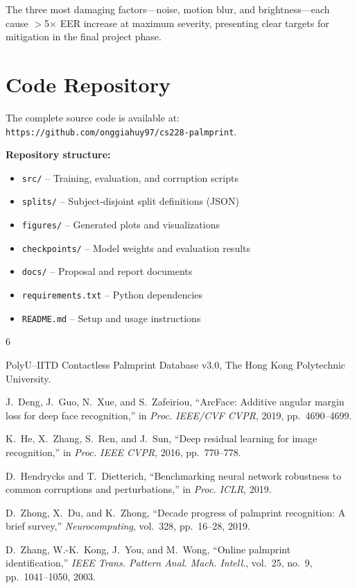 \documentclass[conference]{IEEEtran}
\begin{document}
The three most damaging factors---noise, motion blur, and brightness---each cause $>$5$\times$ EER increase at maximum severity, presenting clear targets for mitigation in the final project phase.

\section{Code Repository}

The complete source code is available at: \texttt{https://github.com/onggiahuy97/cs228-palmprint}.

\medskip
\noindent\textbf{Repository structure:}
\begin{itemize}
    \item \texttt{src/} -- Training, evaluation, and corruption scripts
    \item \texttt{splits/} -- Subject-disjoint split definitions (JSON)
    \item \texttt{figures/} -- Generated plots and visualizations
    \item \texttt{checkpoints/} -- Model weights and evaluation results
    \item \texttt{docs/} -- Proposal and report documents
    \item \texttt{requirements.txt} -- Python dependencies
    \item \texttt{README.md} -- Setup and usage instructions
\end{itemize}


\begin{thebibliography}{6}

PolyU--IITD Contactless Palmprint Database v3.0, The Hong Kong Polytechnic University.

J.~Deng, J.~Guo, N.~Xue, and S.~Zafeiriou, ``ArcFace: Additive angular margin loss for deep face recognition,'' in \textit{Proc. IEEE/CVF CVPR}, 2019, pp.~4690--4699.

K.~He, X.~Zhang, S.~Ren, and J.~Sun, ``Deep residual learning for image recognition,'' in \textit{Proc. IEEE CVPR}, 2016, pp.~770--778.

D.~Hendrycks and T.~Dietterich, ``Benchmarking neural network robustness to common corruptions and perturbations,'' in \textit{Proc. ICLR}, 2019.

D.~Zhong, X.~Du, and K.~Zhong, ``Decade progress of palmprint recognition: A brief survey,'' \textit{Neurocomputing}, vol.~328, pp.~16--28, 2019.

D.~Zhang, W.-K.~Kong, J.~You, and M.~Wong, ``Online palmprint identification,'' \textit{IEEE Trans. Pattern Anal. Mach. Intell.}, vol.~25, no.~9, pp.~1041--1050, 2003.

\end{thebibliography}
\end{document}
